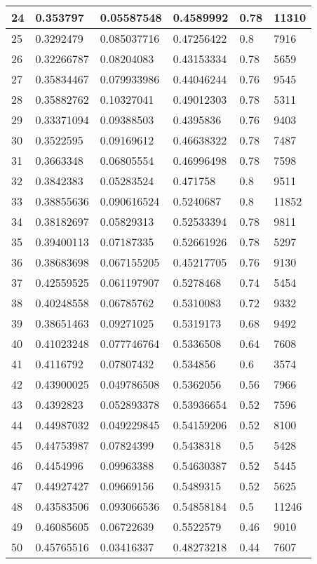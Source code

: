 \begin{longtable}{|l|l|l|l|l|l|}
24 & 0.353797 & 0.05587548 & 0.4589992 & 0.78 & 11310 \\ \hline 
25 & 0.3292479 & 0.085037716 & 0.47256422 & 0.8 & 7916 \\ \hline 
26 & 0.32266787 & 0.08204083 & 0.43153334 & 0.78 & 5659 \\ \hline 
27 & 0.35834467 & 0.079933986 & 0.44046244 & 0.76 & 9545 \\ \hline 
28 & 0.35882762 & 0.10327041 & 0.49012303 & 0.78 & 5311 \\ \hline 
29 & 0.33371094 & 0.09388503 & 0.4395836 & 0.76 & 9403 \\ \hline 
30 & 0.3522595 & 0.09169612 & 0.46638322 & 0.78 & 7487 \\ \hline 
31 & 0.3663348 & 0.06805554 & 0.46996498 & 0.78 & 7598 \\ \hline 
32 & 0.3842383 & 0.05283524 & 0.471758 & 0.8 & 9511 \\ \hline 
33 & 0.38855636 & 0.090616524 & 0.5240687 & 0.8 & 11852 \\ \hline 
34 & 0.38182697 & 0.05829313 & 0.52533394 & 0.78 & 9811 \\ \hline 
35 & 0.39400113 & 0.07187335 & 0.52661926 & 0.78 & 5297 \\ \hline 
36 & 0.38683698 & 0.067155205 & 0.45217705 & 0.76 & 9130 \\ \hline 
37 & 0.42559525 & 0.061197907 & 0.5278468 & 0.74 & 5454 \\ \hline 
38 & 0.40248558 & 0.06785762 & 0.5310083 & 0.72 & 9332 \\ \hline 
39 & 0.38651463 & 0.09271025 & 0.5319173 & 0.68 & 9492 \\ \hline 
40 & 0.41023248 & 0.077746764 & 0.5336508 & 0.64 & 7608 \\ \hline 
41 & 0.4116792 & 0.07807432 & 0.534856 & 0.6 & 3574 \\ \hline 
42 & 0.43900025 & 0.049786508 & 0.5362056 & 0.56 & 7966 \\ \hline 
43 & 0.4392823 & 0.052893378 & 0.53936654 & 0.52 & 7596 \\ \hline 
44 & 0.44987032 & 0.049229845 & 0.54159206 & 0.52 & 8100 \\ \hline 
45 & 0.44753987 & 0.07824399 & 0.5438318 & 0.5 & 5428 \\ \hline 
46 & 0.4454996 & 0.09963388 & 0.54630387 & 0.52 & 5445 \\ \hline 
47 & 0.44927427 & 0.09669156 & 0.5489315 & 0.52 & 5625 \\ \hline 
48 & 0.43583506 & 0.093066536 & 0.54858184 & 0.5 & 11246 \\ \hline 
49 & 0.46085605 & 0.06722639 & 0.5522579 & 0.46 & 9010 \\ \hline 
50 & 0.45765516 & 0.03416337 & 0.48273218 & 0.44 & 7607 \\ \hline 
\end{longtable}